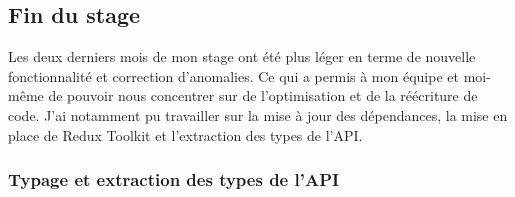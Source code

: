 \documentclass[12pt, a4paper]{report}
\begin{document}
	\newpage
	\subsection{Fin du stage} 
	
	Les deux derniers mois de mon stage ont été plus léger en terme de nouvelle fonctionnalité et correction d'anomalies. Ce qui a permis à mon équipe et moi-même de pouvoir nous concentrer sur de l'optimisation et de la réécriture de code. J'ai notamment pu travailler sur la mise à jour des dépendances, la mise en place de Redux Toolkit et l'extraction des types de l'API.

	\subsubsection{Typage et extraction des types de l'API}	
	
\end{document}

